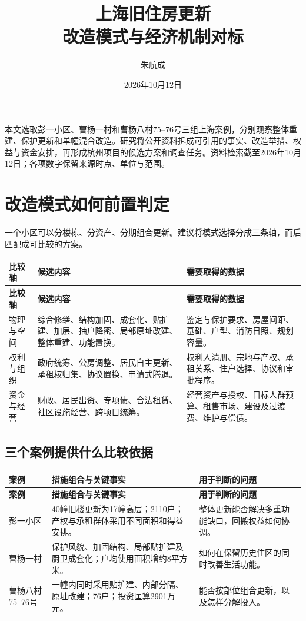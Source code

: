 \documentclass[UTF8,11pt,fontset=windows]{ctexart}
\title{\bfseries\Large 上海旧住房更新\\改造模式与经济机制对标}
\author{\normalsize 朱航成}
\date{\small 2026年10月12日}
\begin{document}
\maketitle
\vspace{-6mm}

本文选取彭一小区、曹杨一村和曹杨八村75--76号三组上海案例，分别观察整体重建、保护更新和单幢混合改造。研究将公开资料拆成可引用的事实、改造举措、权益与资金安排，再形成杭州项目的候选方案和调查任务。资料检索截至2026年10月12日；各项数字保留来源时点、单位与范围。

\section{改造模式如何前置判定}

一个小区可以分楼栋、分资产、分期组合更新。建议将模式选择分成三条轴，而后匹配成可比较的方案。\cite{S10,S11}

\begin{longtable}{@{}L{26mm}L{70mm}L{63mm}@{}}
\toprule
\textbf{比较轴} & \textbf{候选内容} & \textbf{需要取得的数据}\\
\midrule
\endfirsthead
\toprule\textbf{比较轴} & \textbf{候选内容} & \textbf{需要取得的数据}\\\midrule
\endhead
物理与空间 & 综合修缮、结构加固、成套化、贴扩建、加层、抽户降密、局部原址改建、整体重建、功能置换。 & 鉴定与保护要求、房屋间距、基础、户型、消防日照、规划容量。\\
权利与组织 & 政府统筹、公房调整、居民自主更新、承租权归集、协议置换、申请式腾退。 & 权利人清册、宗地与产权、承租关系、住户选择、协议和审批程序。\\
资金与经营 & 财政、居民出资、专项债、合法租赁、社区设施经营、跨项目统筹。 & 经营资产与授权、目标人群预算、租售市场、建设及过渡费、维护与偿债。\\
\bottomrule
\end{longtable}

\subsection{三个案例提供什么比较依据}

\begin{longtable}{@{}L{32mm}L{71mm}L{56mm}@{}}
\toprule\textbf{案例} & \textbf{措施组合与关键事实} & \textbf{用于判断的问题}\\\midrule
\endfirsthead
\toprule\textbf{案例} & \textbf{措施组合与关键事实} & \textbf{用于判断的问题}\\\midrule
\endhead
彭一小区 & 40幢旧楼更新为17幢高层；2110户；产权与承租群体采用不同面积和得益安排。 & 整体更新能否解决多重功能缺口，回搬权益如何协调。\\
曹杨一村 & 保护风貌、加固结构、局部贴扩建及厨卫成套化；户均使用面积增约8平方米。 & 如何在保留历史住区的同时改善生活功能。\\
曹杨八村75--76号 & 一幢内同时采用贴扩建、内部分隔、原址改建；76户；投资匡算2901万元。 & 能否按部位组合更新，以及怎样分解投入。\\
\bottomrule
\end{longtable}
\end{document}

